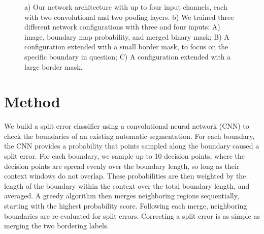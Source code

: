 \begin{figure}[t]
 \centering
    \hfill
	\caption{a) Our network architecture with up to four input channels, each with two convolutional and two pooling layers. b) We trained three different network configurations with three and four inputs: A) image, boundary map probability, and merged binary mask; B) A configuration extended with a small border mask, to focus on the specific boundary in question; C) A configuration extended with a large border mask.}
\end{figure}

\section{Method}
We build a split error classifier using a convolutional neural network (CNN) to check the boundaries of an existing automatic segmentation. For each boundary, the CNN provides a probability that points sampled along the boundary caused a split error. For each boundary, we sample up to 10 decision points, where the decision points are spread evenly over the boundary length, so long as their context windows do not overlap. These probabilities are then weighted by the length of the boundary within the context over the total boundary length, and averaged. A greedy algorithm then merges neighboring regions sequentially, starting with the highest probability score. Following each merge, neighboring boundaries are re-evaluated for split errors. Correcting a split error is as simple as merging the two bordering labels.

